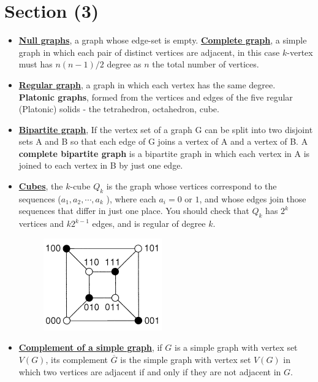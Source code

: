 \documentclass[12pt,a4paper, twocolumn]{article}
\begin{document}
\section*{Section (3)}
\begin{itemize}
	\item \underline{\textbf{Null graphs}}, a graph whose edge-set is empty. \underline{\textbf{Complete graph}}, a simple graph in which each pair of distinct vertices are adjacent, in this case $k$-vertex must has $n(n-1)/2$ degree as $n$ the total number of vertices.
	\item \underline{\textbf{Regular graph}}, a graph in which each vertex has the same degree. \textbf{Platonic graphs}, formed from the vertices and edges of the five regular (Platonic) solids - the tetrahedron, octahedron, cube.
	\item \textbf{\underline{Bipartite graph}}, If the vertex set of a graph G can be split into two disjoint sets A and B so that each edge of G joins a vertex of A and a vertex of B.  A \textbf{complete bipartite graph} is a bipartite graph in which each vertex in A is joined to each vertex in B by just one edge.
	\item \underline{\textbf{Cubes}}, the $k$-cube $Q_k$ is the graph whose vertices correspond to the sequences ($a_1, a_2, \cdots, a_k$ ), where each $a_i = 0 $ or $1$, and whose edges join those sequences that differ in just one place. You should check that $Q_k$ has $2^{k}$ vertices and $k 2^{k-1}$ edges, and is regular of degree $k$.\\
	\begin{figure}[h!]
	\centering
	\includegraphics[scale=0.7]{figures/cube1.png}
	\end{figure}
	\item \textbf{\underline{Complement of a simple graph}}, if $G$ is a simple graph with vertex set $V(G)$, its complement $\overline{G}$ is the simple graph with vertex set $V(G)$ in which two vertices are adjacent if and only if they are not adjacent in $G$.
\end{itemize}
\end{document}
